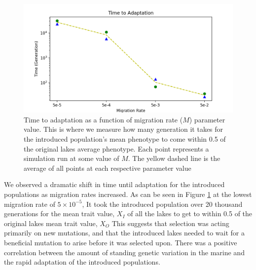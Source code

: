 \documentclass{article}
\newcommand{\plr}[1]{\todo[linecolor=blue,backgroundcolor=blue!25,bordercolor=blue]{#1}}
\begin{document}
\begin{figure}
	\begin{center}
  		\includegraphics[width=0.8\linewidth]{matplotlibPlots/TimeToAdaptation.png}
  		\caption{Time to adaptation as a function of migration rate ($M$) parameter value. This is where we measure how many generation
		it takes for the introduced population's mean phenotype to come within 0.5 of the original lakes average phenotype. 
		Each point represents a simulation run at some value of $M$. 
		The yellow dashed line is the average of all points at each respective parameter value}
  		\label{fig:TimeToAdaptation}
	\end{center}
\end{figure}

We observed a dramatic shift in time until adaptation for the introduced populations
as migration rates increased. 
As can be seen in Figure \ref{fig:TimeToAdaptation} at the lowest migration rate of $5 \times 10^{-5}$,
It took the introduced population over 20 thousand generations for the mean trait value, $X_{I}$ of all the lakes to 
get to within 0.5 of the original lakes mean trait value, $X_{O}$
This suggests that selection was acting primarily on new mutations, and that the 
introduced lakes needed to wait for a beneficial mutation to arise before 
it was selected upon. 
There was a positive correlation between the amount of standing genetic variation in the 
marine and the rapid adaptation of the introduced populations.

\end{document}
